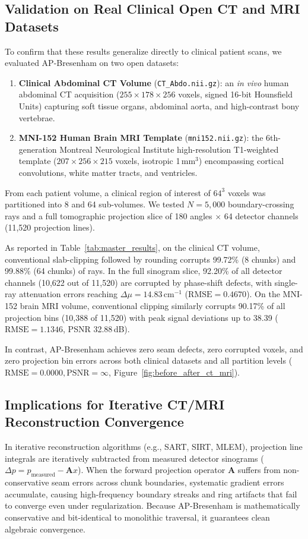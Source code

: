 \documentclass[journal=dme,manuscript=article,11pt]{article}
\begin{document}
\subsection{Validation on Real Clinical Open CT and MRI Datasets}
To confirm that these results generalize directly to clinical patient scans, we evaluated AP-Bresenham on two open datasets:
\begin{enumerate}
    \item \textbf{Clinical Abdominal CT Volume} (\texttt{CT\_Abdo.nii.gz}): an \emph{in vivo} human abdominal CT acquisition ($255 \times 178 \times 256$ voxels, signed 16-bit Hounsfield Units) capturing soft tissue organs, abdominal aorta, and high-contrast bony vertebrae.
    \item \textbf{MNI-152 Human Brain MRI Template} (\texttt{mni152.nii.gz}): the 6th-generation Montreal Neurological Institute high-resolution T1-weighted template ($207 \times 256 \times 215$ voxels, isotropic 1\,mm$^3$) encompassing cortical convolutions, white matter tracts, and ventricles.
\end{enumerate}

From each patient volume, a clinical region of interest of $64^3$ voxels was partitioned into 8 and 64 sub-volumes. We tested $N = 5,000$ boundary-crossing rays and a full tomographic projection slice of 180 angles $\times$ 64 detector channels (11,520 projection lines).

As reported in Table~\ref{tab:master_results}, on the clinical CT volume, conventional slab-clipping followed by rounding corrupts 99.72\% (8 chunks) and 99.88\% (64 chunks) of rays. In the full sinogram slice, 92.20\% of all detector channels (10,622 out of 11,520) are corrupted by phase-shift defects, with single-ray attenuation errors reaching $\Delta \mu = 14.83$\,cm$^{-1}$ ($\mathrm{RMSE} = 0.4670$). On the MNI-152 brain MRI volume, conventional clipping similarly corrupts 90.17\% of all projection bins (10,388 of 11,520) with peak signal deviations up to 38.39 ($\mathrm{RMSE} = 1.1346$, PSNR 32.88\,dB).

In contrast, AP-Bresenham achieves zero seam defects, zero corrupted voxels, and zero projection bin errors across both clinical datasets and all partition levels ($\mathrm{RMSE} = 0.0000, \mathrm{PSNR} = \infty$, Figure~\ref{fig:before_after_ct_mri}).

\subsection{Implications for Iterative CT/MRI Reconstruction Convergence}
In iterative reconstruction algorithms (e.g., SART, SIRT, MLEM), projection line integrals are iteratively subtracted from measured detector sinograms ($\Delta p = p_{\mathrm{measured}} - \mathbf{A} x$). When the forward projection operator $\mathbf{A}$ suffers from non-conservative seam errors across chunk boundaries, systematic gradient errors accumulate, causing high-frequency boundary streaks and ring artifacts that fail to converge even under regularization.\cite{zhang2023distributed,chen2023exact,wang2025distributed} Because AP-Bresenham is mathematically conservative and bit-identical to monolithic traversal, it guarantees clean algebraic convergence.
\end{document}
